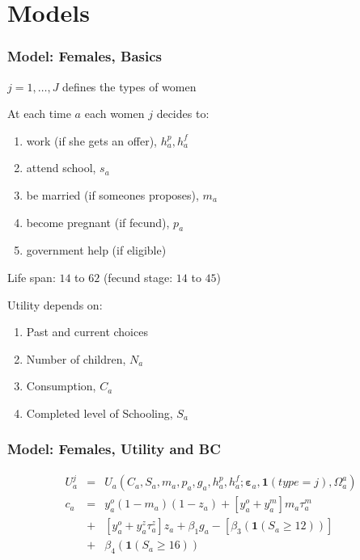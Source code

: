 \section{Models}
\begin{frame}
	\frametitle{Model: Females, Basics}
		\begin{wideitemize}
		\item $j = 1, \ldots, J$ defines the types of women
		\item At each time $a$ each women $j$ decides to:
		\begin{enumerate}
			\item work (if she gets an offer), $h_{a}^p,h_{a}^f$
			\item attend school, $s_{a}$
			\item be married (if someones proposes), $m_{a}$
			\item become pregnant (if fecund), $p_{a}$
			\item government help (if eligible)
		\end{enumerate}
		\item Life span: $14$ to $62$ (fecund stage: $14$ to $45$)
		\item Utility depends on:
			\begin{enumerate}
				\item Past and current choices
				\item Number of children, $N_{a}$
				\item Consumption, $C_{a}$
				\item Completed level of Schooling, $S_{a}$
			\end{enumerate}
		\end{wideitemize}
\end{frame}

\begin{frame}
	\frametitle{Model: Females, Utility and BC}
	\begin{eqnarray}
	U_{a}^j &=& U_{a} \left( C_{a}, S_{a}, m_{a}, p_{a}, g_{a}, h_{a}^p, h_{a}^f; \mathbf{\varepsilon}_{a}, \mathbf{1}(type=j), \Omega_{a}^a \right) \nonumber \\
c_{a} &=& y_{a}^o (1 - m_{a})(1 - z_{a}) + \left[ y_{a}^o + y_{a}^m\right]m_{a}\tau_{a}^m \nonumber \\
	                  &+& \left[ y_{a}^o + y_{a}^z \tau_{a}^z \right]z_{a} + \beta_{1}g_{a} - [\beta_{3}  \left( \mathbf{1}(S_{a} \geq 12) \right) ] \nonumber \\ 
	                 &+& \beta_{4} \left( \mathbf{1}(S_{a} \geq 16) \right) \nonumber
	\end{eqnarray}
	
\end{frame}


